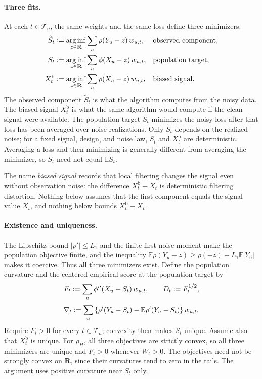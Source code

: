 \documentclass[11pt]{article}
\newcommand{\E}{\mathbb{E}}
\newcommand{\R}{\mathbf{R}}
\newcommand{\eqdef}{\mathrel{\vcentcolon=}}
\newcommand{\arginf}{\mathop{\mathrm{arg\,inf}}}
\newcommand{\rhohu}{\rho}
\newcommand{\rhohum}{\phi}
\newcommand{\Signal}{X}
\newcommand{\BiasedSignal}{X^{\mathrm b}}
\newcommand{\Data}{Y}
\newcommand{\IMFs}{S}
\newcommand{\IMFt}{\widetilde S}
\newcommand{\IF}{F}
\newcommand{\DFN}{D}
\theoremstyle{definition}
\begin{document}
\paragraph{Three fits.}
At each \(t\in\mathcal T_n\), the same weights and the same loss define three
minimizers:
\begin{align}
  \IMFt_t
    &\eqdef\arginf_{z\in\R}\sum_u\rhohu(\Data_u-z)\,w_{u,t},
    &&\text{observed component},\notag\\
  \IMFs_t
    &\eqdef\arginf_{z\in\R}\sum_u\rhohum(\Signal_u-z)\,w_{u,t},
    &&\text{population target},
    \label{eq:estimators}\\
  \BiasedSignal_t
    &\eqdef\arginf_{z\in\R}\sum_u\rhohu(\Signal_u-z)\,w_{u,t},
    &&\text{biased signal}.
    \label{eq:biased-signal}
\end{align}
The observed component \(\IMFt_t\) is what the algorithm computes from the
noisy data.  The biased signal \(\BiasedSignal_t\) is what the same algorithm
would compute if the clean signal were available.  The population target
\(\IMFs_t\) minimizes the noisy loss after that loss has been averaged over
noise realizations.  Only \(\IMFt_t\) depends on the realized noise; for a
fixed signal, design, and noise law, \(\IMFs_t\) and \(\BiasedSignal_t\) are
deterministic.  Averaging a loss and then minimizing is generally different
from averaging the minimizer, so \(\IMFs_t\) need not equal \(\E\IMFt_t\).

The name \emph{biased signal} records that local filtering changes the signal
even without observation noise: the difference \(\BiasedSignal_t-\Signal_t\)
is deterministic filtering distortion.  Nothing below assumes that the first
component equals the signal value \(\Signal_t\), and nothing below bounds
\(\BiasedSignal_t-\Signal_t\).

\paragraph{Existence and uniqueness.}
The Lipschitz bound \(|\rhohu'|\leq L_1\) and the finite first noise moment
make the population objective finite, and the inequality
\(\E\rhohu(\Data_u-z)\geq\rhohu(-z)-L_1\E|\Data_u|\) makes it coercive.
Thus all three minimizers exist.  Define the population curvature and the
centered empirical score at the population target by
\begin{equation}
  \IF_t\eqdef\sum_u\rhohum''(\Signal_u-\IMFs_t)\,w_{u,t},
  \qquad
  \DFN_t\eqdef\IF_t^{1/2},
  \label{eq:curvature}
\end{equation}
\begin{equation}
  \nabla_t\eqdef\sum_u\left\{
       \rhohu'(\Data_u-\IMFs_t)-\E\rhohu'(\Data_u-\IMFs_t)
     \right\}w_{u,t}.
  \label{eq:nabla}
\end{equation}
Require \(\IF_t>0\) for every \(t\in\mathcal T_n\); convexity then makes
\(\IMFs_t\) unique.  Assume also that \(\BiasedSignal_t\) is unique.  For
\(\rho_H\), all three objectives are strictly convex, so all three minimizers
are unique and \(\IF_t>0\) whenever \(W_t>0\).  The objectives need not be
strongly convex on \(\R\), since their curvatures tend to zero in the tails.
The argument uses positive curvature near \(\IMFs_t\) only.
\end{document}
